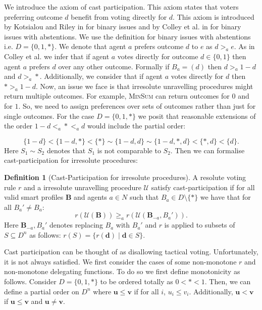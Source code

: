 \documentclass[11pt,a4paper, titlepage]{article}
\theoremstyle{definition}
\newtheorem{definition}[theorem]{Definition}
\let\vec\mathbf
\begin{document}
We introduce the axiom of cast participation. This axiom states that voters preferring outcome $d$ benefit from voting directly for $d$. 
This axiom is introduced by Kotsialou and Riley in \cite{kotsialou} for binary issues and by Colley et al. in \cite{grandi} for binary issues with abstentions. 
We use the definition for binary issues with abstentions i.e. $D = \{0, 1, *\}$.
We denote that agent $a$ prefers outcome $d$ to $e$ as $d >_a e$. As in Colley et al. we infer that if agent $a$ votes directly for outcome $d \in \{0, 1\}$ then agent $a$ prefers $d$ over any other outcome. 
Formally if $B_a = (d)$ then $ d >_a 1-d$ and $d >_a *$.
Additionally, we consider that if agent $a$ votes directly for $d$ then $* >_a 1-d$.
Now, an issue we face is that irresolute unravelling procedures might return multiple outcomes. 
For example, \textsc{MinSum} can return outcomes for $0$ and for $1$.
So, we need to assign preferences over sets of outcomes rather than just for single outcomes.
For the case $D = \{0, 1, *\}$ we posit that reasonable extensions of the order $1-d <_a * <_a d$ would include the partial order:

\[
    \{1-d\} < \{1-d, *\} < \{*\} \sim \{1-d, d\} \sim \{1-d, *, d\} < \{*, d \}< \{d\}.
\]
Here $S_1 \sim S_2$ denotes that $S_1$ is not comparable to $S_2$.
Then we can formalise cast-participation for irresolute procedures:

\begin{definition}[Cast-Participation for irresolute procedures]
    A resolute voting rule $r$ and a irresolute unravelling procedure $\mathcal{U}$ satisfy cast-participation if for all valid smart profiles $\mathbf{B}$ and agents $a \in N$ such that $B_a \in D \setminus \{*\}$ we have that for all $B_a' \neq B_a$:
    \[
        r(\mathcal{U}(\mathbf{B})) \geq_a r(\mathcal{U}(\mathbf{B}_{-a}, B_a')).
    \]
    Here $\mathbf{B}_{-a}, B_a'$ denotes replacing $B_a$ with $B_a'$ and $r$ is applied to subsets of $S \subseteq D^n$ as follows: $r(S) = \{r(\vec{d}) \mid \vec{d} \in S\}$.
\end{definition}

Cast participation can be thought of as disallowing tactical voting. Unfortunately, it is not always satisfied. 
We first consider the cases of some non-monotone $r$ and non-monotone delegating functions. 
To do so we first define monotonicity as follows.
Consider $D = \{0, 1, *\}$ to be ordered totally as $0 < * < 1$.
Then, we can define a partial order on $D^n$ where $\vec{u} \leq \vec{v}$ if for all $i$, $u_i \leq v_i$. Additionally, $\vec{u} < \vec{v}$ if $\vec{u} \leq \vec{v}$ and $\vec{u} \neq \vec{v}$.
\end{document}
